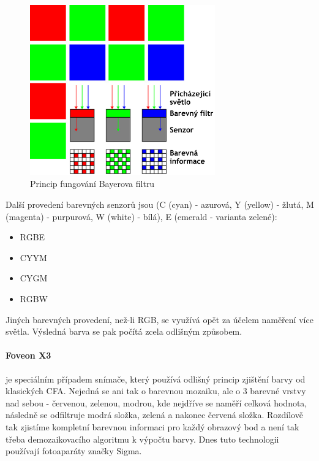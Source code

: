 \documentclass[12pt,a4paper,titlepage,final]{report}
\begin{document}
\begin{figure}[ht]
\begin{center}
\includegraphics[width=8cm]{images/bayer-mask.pdf}
\caption{Princip fungování Bayerova filtru}
\label{fig:bayer}
\end{center}
\end{figure}

Další provedení barevných senzorů jsou (C (cyan) - azurová, Y (yellow) - žlutá, M (magenta) - purpurová, W (white) - bílá), E (emerald - varianta zelené):
\begin{itemize}
	\item RGBE 
	\item CYYM
	\item CYGM
	\item RGBW
\end{itemize}

Jiných barevných provedení, než-li RGB, se využívá opět za účelem naměření více světla. Výsledná barva se pak počítá zcela odlišným způsobem.

\paragraph{Foveon X3} je speciálním případem snímače, který používá odlišný princip zjištění barvy od klasických CFA. Nejedná se ani tak o barevnou mozaiku, ale o 3 barevné vrstvy nad sebou - červenou, zelenou, modrou, kde nejdříve se naměří celková hodnota, následně se odfiltruje modrá složka, zelená a nakonec červená složka. Rozdílově tak zjistíme kompletní barevnou informaci pro každý obrazový bod a není tak třeba demozaikovacího algoritmu k výpočtu barvy. Dnes tuto technologii používají fotoaparáty značky Sigma. 
\end{document}
